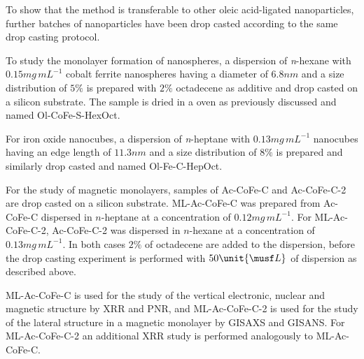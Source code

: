 \documentclass[\main/dresen_thesis.tex]{subfiles}
\begin{document}
      To show that the method is transferable to other oleic acid-ligated nanoparticles, further batches of nanoparticles have been drop casted according to the same drop casting protocol.

      To study the monolayer formation of nanospheres, a dispersion of \textit{n}-hexane with $0.15 \unit{mg \, mL^{-1}}$ cobalt ferrite nanospheres having a diameter of $6.8 \unit{nm}$ and a size distribution of $5 \unit{\%}$ is prepared with $2 \unit{\%}$ octadecene as additive and drop casted on a silicon substrate.
      The sample is dried in a oven as previously discussed and named Ol-CoFe-S-HexOct.

      For iron oxide nanocubes, a dispersion of \textit{n}-heptane with $0.13 \unit{mg \, mL^{-1}}$ nanocubes having an edge length of $11.3 \unit{nm}$ and a size distribution of $8\unit{\%}$ is prepared and similarly drop casted and named Ol-Fe-C-HepOct.

      For the study of magnetic monolayers, samples of Ac-CoFe-C and Ac-CoFe-C-2 are drop casted on a silicon substrate.
      ML-Ac-CoFe-C was prepared from Ac-CoFe-C dispersed in $\mathit{n}$-heptane at a concentration of $0.12 \unit{mg \, mL^{-1}}$.
      For ML-Ac-CoFe-C-2, Ac-CoFe-C-2 was dispersed in $\mathit{n}$-hexane at a concentration of $0.13 \unit{mg \, mL^{-1}}$.
      In both cases $2 \unit{\%}$ of octadecene are added to the dispersion, before the drop casting experiment is performed with $50 \unit{\musf L}$ of dispersion as described above.

      ML-Ac-CoFe-C is used for the study of the vertical electronic, nuclear and magnetic structure by XRR and PNR, and ML-Ac-CoFe-C-2 is used for the study of the lateral structure in a magnetic monolayer by GISAXS and GISANS.
      For ML-Ac-CoFe-C-2 an additional XRR study is performed analogously to ML-Ac-CoFe-C.
\end{document}
